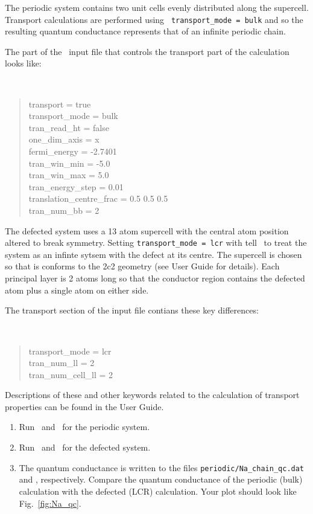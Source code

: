\documentclass[a4paper,11pt,twoside]{article}
\begin{document}
The periodic system contains two unit cells evenly distributed along
the supercell. Transport calculations are performed using {\tt
  transport\_mode = bulk} and so the resulting quantum conductance
represents that of an infinite periodic chain.

The part of the \wannier\ input file that controls the transport part
of the calculation looks like:

{\tt
\begin{quote}
transport = true\\
transport\_mode = bulk\\
tran\_read\_ht = false\\
one\_dim\_axis = x\\
fermi\_energy = -2.7401\\
tran\_win\_min = -5.0\\
tran\_win\_max = 5.0\\
tran\_energy\_step = 0.01\\
translation\_centre\_frac = 0.5 0.5 0.5\\
tran\_num\_bb = 2

\end{quote} }

The defected system uses a 13 atom supercell with the central atom
position altered to break symmetry. Setting {\tt transport\_mode = lcr} with tell 
\wannier\ to treat the system as an infinte sytsem with the defect at its centre.
The supercell is chosen so that is conforms to the 2c2 geometry (see User Guide 
for details). Each principal layer is 2 atoms long so that the conductor 
region contains the defected atom plus a single atom on either side.

The transport section of the input file contians  these key differences:

{\tt
\begin{quote}
transport\_mode = lcr\\
tran\_num\_ll = 2\\
tran\_num\_cell\_ll = 2\\

\end{quote} }

Descriptions of these and other keywords related to the calculation of
transport properties can be found in the User Guide.

\begin{enumerate}
\item Run \pwscf\ and \wannier\ for the periodic system.
\item Run \pwscf\ and \wannier\ for the defected system.
\item The quantum conductance is written to the files {\tt periodic/Na\_chain\_qc.dat} 
and , respectively. 
Compare the quantum conductance of the periodic (bulk) calculation with the
defected (LCR) calculation. Your plot should look like Fig.~\ref{fig:Na_qc}.
\end{enumerate}
\end{document}
